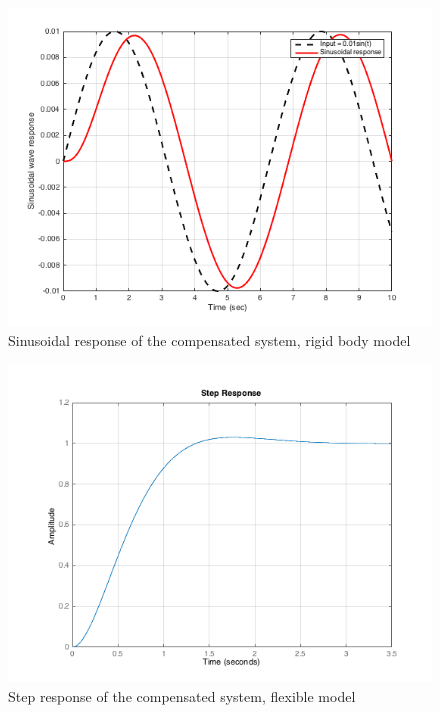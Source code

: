 \documentclass[a4paper, 12pt]{article}
\begin{document}
\begin{figure}[!htbp]
\centering
\includegraphics[scale = 0.6]{SinusoidalResponseLeadLag}
\caption{Sinusoidal response of the compensated system, rigid body model}
\label{SinusoidalResponseLeadLag}
\end{figure}

\begin{figure}[!htbp]
\centering
\includegraphics[scale = 0.6]{FlexibleStepResponseLeadLag}
\caption{Step response of the compensated system, flexible model}
\label{FlexibleStepResponseLeadLag}
\end{figure}
\end{document}
